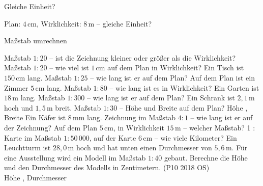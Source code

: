 \setcounter{aufgabe}{11}

\begin{aufgabe}{Gleiche Einheit?}
\begin{teile}
\teil Plan: $4\,\text{cm}$, Wirklichkeit: $8\,\text{m}$ – gleiche Einheit?  \\ 
\end{teile}
\end{aufgabe}

\begin{aufgabe}{Maßstab umrechnen}
\begin{teile}
\teil Maßstab $1 : 20$ – ist die Zeichnung kleiner oder größer als die Wirklichkeit?  \\ 
\teil Maßstab $1 : 20$ – wie viel ist $1\,\text{cm}$ auf dem Plan in Wirklichkeit? \leerfeld[cm]
\teil Ein Tisch ist $150\,\text{cm}$ lang. Maßstab $1 : 25$ – wie lang ist er auf dem Plan? \leerfeld[cm]
\teil Auf dem Plan ist ein Zimmer $5\,\text{cm}$ lang. Maßstab $1 : 80$ – wie lang ist es in Wirklichkeit? \leerfeld[m]
\teil Ein Garten ist $18\,\text{m}$ lang. Maßstab $1 : 300$ – wie lang ist er auf dem Plan? \leerfeld[cm]
\teil Ein Schrank ist $2{,}1\,\text{m}$ hoch und $1{,}5\,\text{m}$ breit. Maßstab $1 : 30$ – Höhe und Breite auf dem Plan? Höhe \leerfeld[cm] , Breite \leerfeld[cm]
\teil Ein Käfer ist $8\,\text{mm}$ lang. Zeichnung im Maßstab $4 : 1$ – wie lang ist er auf der Zeichnung? \leerfeld[mm]
\teil Auf dem Plan $5\,\text{cm}$, in Wirklichkeit $15\,\text{m}$ – welcher Maßstab? 1 : \leerfeld
\teil Karte im Maßstab $1 : 50\,000$, auf der Karte $6\,\text{cm}$ – wie viele Kilometer? \leerfeld[km]
\teil Ein Leuchtturm ist $28{,}0\,\text{m}$ hoch und hat unten einen Durchmesser von $5{,}6\,\text{m}$. Für eine Ausstellung wird ein Modell im Maßstab $1 : 40$ gebaut. Berechne die Höhe und den Durchmesser des Modells in Zentimetern. \hfill (P10 2018 OS) \\ Höhe \leerfeld[cm] , Durchmesser \leerfeld[cm]
\end{teile}
\end{aufgabe}

